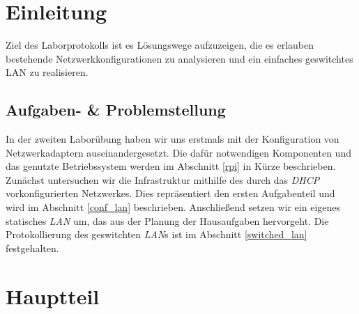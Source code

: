 \documentclass[paper=a4,fontsize=11pt]{scrartcl}%
\numberwithin{equation}{section}
\begin{document}
\newpage
\tableofcontents
\newpage

\section{Einleitung}
Ziel des Laborprotokolls ist es Lösungswege aufzuzeigen, die es erlauben bestehende Netzwerkkonfigurationen zu analysieren und ein einfaches geswitchtes \ac{LAN} zu realisieren.
\subsection{Aufgaben- \& Problemstellung}
In der zweiten Laborübung haben wir uns erstmals mit der Konfiguration von Netzwerkadaptern auseinandergesetzt. Die dafür notwendigen Komponenten und das genutzte Betriebssystem werden im Abschnitt \ref{rpi} in Kürze beschrieben.\\

Zunächst untersuchen wir die Infrastruktur mithilfe des durch das \emph{\ac{DHCP}} vorkonfigurierten Netzwerkes. Dies repräsentiert den ersten Aufgabenteil und wird im Abschnitt \ref{conf_lan} beschrieben. Anschließend setzen wir ein eigenes statisches \emph{\ac{LAN}} um, das aus der Planung der Hausaufgaben hervorgeht. Die Protokollierung des geswitchten \emph{LAN}s ist im Abschnitt \ref{switched_lan} festgehalten.

\section{Hauptteil}
\end{document}
